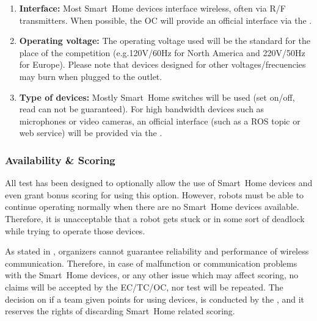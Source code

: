 \begin{enumerate}
	\item \textbf{Interface:} Most Smart~Home devices interface wireless, often via R/F transmitters. When possible, the OC will provide an official interface via the .
	\item \textbf{Operating voltage:} The operating voltage used will be the standard for the place of the competition (e.g.120V/60Hz for North America and 220V/50Hz for Europe). Please note that devices designed for other voltages/frecuencies may burn when plugged to the outlet.
	\item \textbf{Type of devices:} Mostly Smart~Home switches will be used (set on/off, read can not be guaranteed). For high bandwidth devices such as microphones or video cameras, an official interface (such as a ROS topic or web service) will be provided via the .
\end{enumerate}

\subsubsection{Availability \& Scoring}
All test has been designed to optionally allow the use of Smart~Home devices and even grant bonus scoring for using this option. However, robots must be able to continue operating normally when there are no Smart~Home devices available. Therefore, it is unacceptable that a robot gets stuck or in some sort of deadlock while trying to operate those devices.

As stated in , organizers cannot guarantee reliability and performance of wireless communication. Therefore, in case of malfunction or communication problems with the Smart~Home devices, or any other issue which may affect scoring, no claims will be accepted by the EC/TC/OC, nor test will be repeated. The decision on if a team given points for using  devices, is conducted by the , and it reserves the rights of discarding Smart~Home related scoring.


